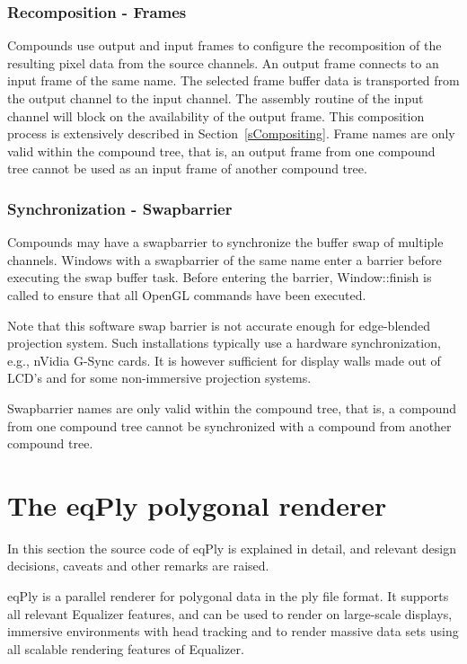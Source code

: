 \documentclass[10pt,a4]{scrartcl}
\newcommand{\sref}[1]{Section~\ref{#1}}
\begin{document}
\subsubsection{Recomposition - Frames}
Compounds use output and input frames to configure the recomposition of
the resulting pixel data from the source channels. An output frame
connects to an input frame of the same name. The selected frame buffer
data is transported from the output channel to the input channel. The
assembly routine of the input channel will block on the availability of
the output frame. This composition process is extensively described in
\sref{sCompositing}. Frame names are only valid within the compound
tree, that is, an output frame from one compound tree cannot be used as
an input frame of another compound tree.

\subsubsection{Synchronization - Swapbarrier}
Compounds may have a swapbarrier to synchronize the buffer swap of
multiple channels. Windows with a swapbarrier of the same name enter a
barrier before executing the swap buffer task. Before entering the
barrier, \textsf{Window::finish} is called to ensure that all OpenGL
commands have been executed.

Note that this software swap barrier is not accurate enough for
edge-blended projection system. Such installations typically use a
hardware synchronization, e.g., nVidia G-Sync cards. It is however
sufficient for display walls made out of LCD's and for some
non-immersive projection systems.

Swapbarrier names are only valid within the compound tree, that is, a
compound from one compound tree cannot be synchronized with a compound
from another compound tree.

\section{\label{sEqPly}The eqPly polygonal renderer}

In this section the source code of \textsf{eqPly} is explained in
detail, and relevant design decisions, caveats and other remarks are
raised.

\textsf{eqPly} is a parallel renderer for polygonal data in the
\textsf{ply} file format. It supports all relevant Equalizer features,
and can be used to render on large-scale displays, immersive
environments with head tracking and to render massive data sets using
all scalable rendering features of Equalizer.
\end{document}
